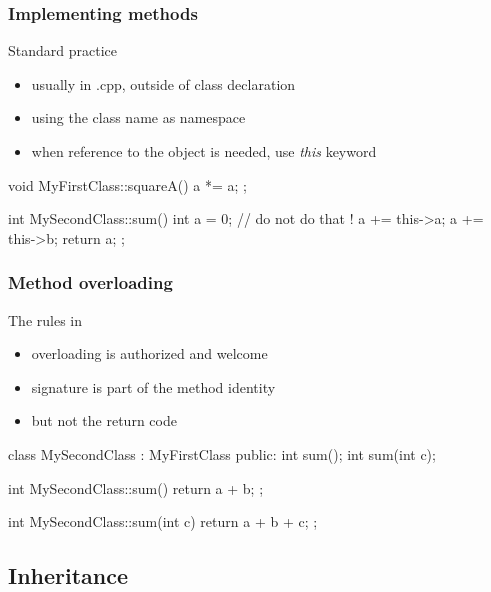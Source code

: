 \begin{frame}[fragile]
  \frametitle{Implementing methods}
  \begin{block}{Standard practice}
    \begin{itemize}
    \item usually in .cpp, outside of class declaration
    \item using the class name as namespace
    \item when reference to the object is needed, use {\it this} keyword
    \end{itemize}
  \end{block}
  \begin{cppcode}
    void MyFirstClass::squareA() {
      a *= a;
    };

    int MySecondClass::sum() {
      int a = 0; // do not do that !
      a += this->a;
      a += this->b;
      return a;
    };
  \end{cppcode}
\end{frame}

\begin{frame}[fragile]
  \frametitle{Method overloading}
  \begin{block}{The rules in \cpp}
    \begin{itemize}
    \item overloading is authorized and welcome
    \item signature is part of the method identity
    \item but not the return code
    \end{itemize}
  \end{block}
  \begin{cppcode}
    class MySecondClass : MyFirstClass {
    public:
      int sum();
      int sum(int c);
    }

    int MySecondClass::sum() { return a + b; };

    int MySecondClass::sum(int c) { return a + b + c; };
  \end{cppcode}
\end{frame}

\subsection{Inheritance}

